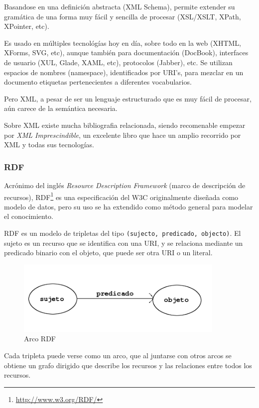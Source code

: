 Basandose en una definición abstracta (XML Schema), permite extender su gramática 
de una forma muy fácil y sencilla de procesar (XSL/XSLT, XPath, XPointer, etc).

Es usado en múltiples tecnológías hoy en día, sobre todo en la web (XHTML, XForms, 
SVG, etc), aunque también para documentación (DocBook), interfaces de usuario (XUL,
Glade, XAML, etc), protocolos (Jabber), etc. Se utilizan espacios de nombres (namespace), 
identificados por URI's, para mezclar en un documento etiquetas pertenecientes a 
diferentes vocabularios.

Pero XML, a pesar de ser un lenguaje estructurado que es muy fácil de procesar, 
aún carece de la semántica necesaria. 

Sobre XML existe mucha bibliografia relacionada, siendo recomenable empezar por
\emph{XML Imprescindible}\cite{XMLNutshell}, un excelente libro que hace un amplio
recorrido por XML y todas sus tecnologías.

\subsubsection{RDF}

Acrónimo del inglés \emph{Resource Description Framework} (marco de descripción 
de recursos), RDF\footnote{\url{http://www.w3.org/RDF/}} es una especificación del 
W3C originalmente diseñada como modelo de datos, pero su uso se ha extendido como
método general para modelar el conocimiento.

RDF es un modelo de tripletas del tipo \texttt{(sujecto, predicado, objecto)}. El
sujeto es un recurso que se identifica con una URI, y se relaciona mediante un 
predicado binario con el objeto, que puede ser otra URI o un literal.

\begin{figure}[H]
	\centering
	\includegraphics[width=10cm]{images/arc.png}
	\caption{Arco RDF}
	\label{fig:rdfTriplet}
\end{figure}

Cada tripleta puede verse como un arco, que al juntarse con otros arcos se obtiene
un grafo dirigido que describe los recursos y las relaciones entre todos los 
recursos.

